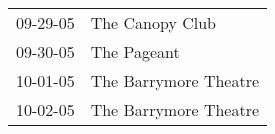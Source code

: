\begin{supertabular}{p{0.07\textwidth}p{0.23\textwidth}}
 09-29-05 &        The Canopy Club \\
 09-30-05 &            The Pageant \\
 10-01-05 &  The Barrymore Theatre \\
 10-02-05 &  The Barrymore Theatre \\
\end{supertabular}
